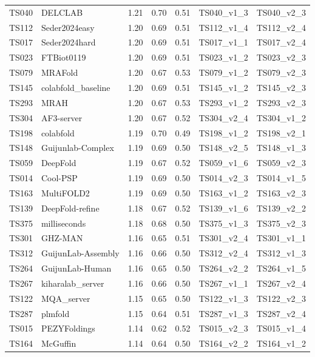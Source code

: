 \begin{longtable}{lllllll}
TS040 & DELCLAB & 1.21 & 0.70 & 0.51 & TS040\_v1\_3 & TS040\_v2\_3 \\ 
TS112 & Seder2024easy & 1.20 & 0.69 & 0.51 & TS112\_v1\_4 & TS112\_v2\_4 \\ 
TS017 & Seder2024hard & 1.20 & 0.69 & 0.51 & TS017\_v1\_1 & TS017\_v2\_4 \\ 
TS023 & FTBiot0119 & 1.20 & 0.69 & 0.51 & TS023\_v1\_2 & TS023\_v2\_3 \\ 
TS079 & MRAFold & 1.20 & 0.67 & 0.53 & TS079\_v1\_2 & TS079\_v2\_3 \\ 
TS145 & colabfold\_baseline & 1.20 & 0.69 & 0.51 & TS145\_v1\_2 & TS145\_v2\_3 \\ 
TS293 & MRAH & 1.20 & 0.67 & 0.53 & TS293\_v1\_2 & TS293\_v2\_3 \\ 
TS304 & AF3-server & 1.20 & 0.67 & 0.52 & TS304\_v2\_4 & TS304\_v1\_2 \\ 
TS198 & colabfold & 1.19 & 0.70 & 0.49 & TS198\_v1\_2 & TS198\_v2\_1 \\ 
TS148 & Guijunlab-Complex & 1.19 & 0.69 & 0.50 & TS148\_v2\_5 & TS148\_v1\_3 \\ 
TS059 & DeepFold & 1.19 & 0.67 & 0.52 & TS059\_v1\_6 & TS059\_v2\_3 \\ 
TS014 & Cool-PSP & 1.19 & 0.69 & 0.50 & TS014\_v2\_3 & TS014\_v1\_5 \\ 
TS163 & MultiFOLD2 & 1.19 & 0.69 & 0.50 & TS163\_v1\_2 & TS163\_v2\_3 \\ 
TS139 & DeepFold-refine & 1.18 & 0.67 & 0.52 & TS139\_v1\_6 & TS139\_v2\_2 \\ 
TS375 & milliseconds & 1.18 & 0.68 & 0.50 & TS375\_v1\_3 & TS375\_v2\_3 \\ 
TS301 & GHZ-MAN & 1.16 & 0.65 & 0.51 & TS301\_v2\_4 & TS301\_v1\_1 \\ 
TS312 & GuijunLab-Assembly & 1.16 & 0.66 & 0.50 & TS312\_v2\_4 & TS312\_v1\_3 \\ 
TS264 & GuijunLab-Human & 1.16 & 0.65 & 0.50 & TS264\_v2\_2 & TS264\_v1\_5 \\ 
TS267 & kiharalab\_server & 1.16 & 0.66 & 0.50 & TS267\_v1\_1 & TS267\_v2\_4 \\ 
TS122 & MQA\_server & 1.15 & 0.65 & 0.50 & TS122\_v1\_3 & TS122\_v2\_3 \\ 
TS287 & plmfold & 1.15 & 0.64 & 0.51 & TS287\_v1\_3 & TS287\_v2\_4 \\ 
TS015 & PEZYFoldings & 1.14 & 0.62 & 0.52 & TS015\_v2\_3 & TS015\_v1\_4 \\ 
TS164 & McGuffin & 1.14 & 0.64 & 0.50 & TS164\_v2\_2 & TS164\_v1\_2 \\ 

\end{longtable}
